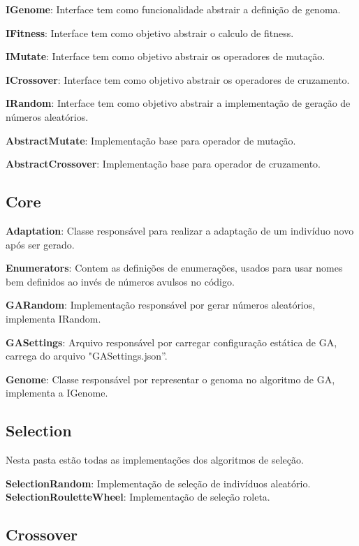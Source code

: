  \textbf{IGenome}: Interface tem como funcionalidade abstrair a definição de genoma.
 
 \textbf{IFitness}: Interface tem como objetivo abstrair o calculo de fitness.
 
 \textbf{IMutate}: Interface tem como objetivo abstrair os operadores de mutação.
 
 \textbf{ICrossover}:  Interface tem como objetivo abstrair os operadores de cruzamento.
 
 \textbf{IRandom}: Interface tem como objetivo abstrair a implementação de geração de números aleatórios.
 
 \textbf{AbstractMutate}: Implementação base para operador de mutação.
 
 \textbf{AbstractCrossover}: Implementação base para operador de cruzamento.
 
 \subsection{Core}
 
 \textbf{Adaptation}: Classe responsável para realizar a adaptação de um indivíduo novo após ser gerado.
 
 \textbf{Enumerators}: Contem as definições de enumerações, usados para usar nomes bem definidos ao invés de números avulsos no código.
 
 \textbf{GARandom}: Implementação responsável por gerar números aleatórios, implementa IRandom.
 
 \textbf{GASettings}: Arquivo responsável por carregar configuração estática de GA, carrega do arquivo "GASettings.json”.
 
 \textbf{Genome}: Classe responsável por representar o genoma no algoritmo de GA, implementa a IGenome.
 
 
 \subsection{Selection}
 
 Nesta pasta estão todas as implementações dos algoritmos de seleção.
 
 \textbf{SelectionRandom}: Implementação de seleção de indivíduos aleatório.
 \textbf{SelectionRouletteWheel}: Implementação de seleção roleta.
 
 \subsection{Crossover}
 
